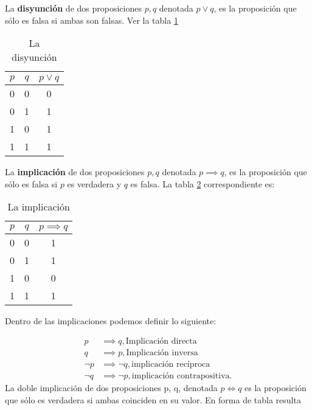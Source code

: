 \begin{definition}[Disyunción]
	La \textbf{disyunción} de dos proposiciones $p, q$ denotada $p \vee q$, es la proposición que sólo es falsa si ambas son falsas. Ver la tabla \ref{tabfmc4}
\end{definition}

\begin{table}[h!]
	\centering
	\begin{tabular}{|c|c|c|}
		\hline
		$p$ & $q$ & $p \vee q$ \\ \hline
		0   & 0   & 0          \\ \hline
		0   & 1   & 1          \\ \hline
		1   & 0   & 1          \\ \hline
		1   & 1   & 1          \\ \hline
	\end{tabular}
	\caption{La disyunción}
	\label{tabfmc4}
\end{table}

\begin{definition}[Implicación]
	La \textbf{implicación} de dos proposiciones $p, q$ denotada $p \implies q$, es la proposición que sólo es falsa si $p$ es verdadera y $q$ es falsa.
	La tabla \ref{tabfmc5} correspondiente es:
\end{definition}


\begin{table}[h!]
	\centering
	\begin{tabular}{|c|c|c|}
		\hline
		$p$ & $q$ & $p \implies q$ \\ \hline
		0   & 0   & 1              \\ \hline
		0   & 1   & 1              \\ \hline
		1   & 0   & 0              \\ \hline
		1   & 1   & 1              \\ \hline
	\end{tabular}
	\caption{La implicación}
	\label{tabfmc5}
\end{table}

Dentro de las implicaciones podemos definir lo siguiente:

\begin{align}
	p       & \implies q, \text{Implicación directa}               \\
	q       & \implies p, \text{Implicación inversa}               \\
	\lnot p & \implies \lnot q, \text{implicación recíproca}       \\
	\lnot q & \implies \lnot p, \text{implicación contrapositiva.}
\end{align}
La doble implicación de dos proposiciones p, q, denotada $p \Leftrightarrow q$ es la proposición que sólo es verdadera si ambas coinciden en su valor.
En forma de tabla resulta

